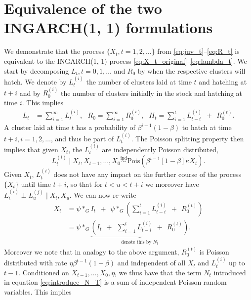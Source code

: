\documentclass[review]{elsarticle}
\begin{document}
\appendix
\section{Equivalence of the two INGARCH(1, 1) formulations}
\label{appendix:proof}

We demonstrate that the process $\{X_t, t = 1, 2, \dots\}$ from \eqref{eq:juv_t}--\eqref{eq:R_t} is equivalent to the INGARCH(1, 1) process \eqref{eq:X_t_original}--\eqref{eq:lambda_t}. We start by decomposing $L_t, t = 0, 1, \dots$ and $R_0$ by when the respective clusters will hatch. We denote by $L_t^{(i)}$ the number of clusters laid at time $t$ and hatching at $t + i$ and by $R^{(i)}_0$ the number of clusters initially in the stock and hatching at time $i$. This implies
\begin{align*}
L_t & = \sum_{i = 1}^\infty L_t^{(i)}, \ \ \ 
R_0 = \sum_{i = 1}^\infty R_0^{(i)}, \ \ \ 
H_t = \sum_{i = 1}^{t} L_{t - i}^{(i)} \ \ + \ \ R_0^{(t)}.
\end{align*}
A cluster laid at time $t$ has a probability of $\beta^{i - 1}(1 - \beta)$ to hatch at time $t + i, i = 1, 2, \dots$, and thus be part of $L_t^{(i)}$. The Poisson splitting property \cite{Kingman1993} then implies that given $X_t$, the $L_t^{(i)}$ are independently Poisson distributed,
$$
L_t^{(i)} \mid X_t, X_{t - 1}, \dots, X_0 \stackrel{\text{ind}}{\sim} \text{Pois}(\beta^{i - 1}[1 - \beta]\kappa X_t). %
$$
Given $X_t$, $L_t^{(i)}$ does not have any impact on the further course of the process $\{X_t\}$ until time $t + i$, so that for $t < u < t + i$ we moreover have $L_t^{(i)} \perp L_u^{(j)} \mid X_t, X_u$. We can now re-write
\begin{align}
X_t & = \psi *_G I_t \ \ + \ \ \psi *_G\left(\sum_{i = 1}^{t} L_{t - i}^{(i)} \ \ + \ \ R_0^{(t)}\right)\nonumber \\
& = \psi *_G \underbrace{\left( I_t \ \ + \ \ \sum_{i = 1}^{t} L_{t - i}^{(i)} \ \ + \ \ R_0^{(t)}\right)}_{\text{denote this by } N_t}. \label{eq:introduce_N_T}
\end{align}
Moreover we note that in analogy to the above argument, $R_0^{(t)}$ is Poisson distributed with rate $\eta\beta^{t - 1}(1 - \beta)$ and independent of all $X_t$ and $L_t^{(i)}$ up to $t - 1$. Conditioned on $X_{t - 1}, \dots, X_0, \eta$, we thus have that the term $N_t$ introduced in equation \eqref{eq:introduce_N_T} is a sum of independent Poisson random variables. This implies
\end{document}
